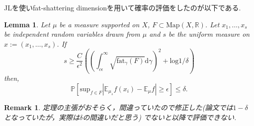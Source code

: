 \documentclass{ujarticle}
\newtheorem{lem}[thm]{Lemma}
\newtheorem*{rem}{Remark}
\begin{document}
JLを使いfat-shattering dimensionを用いて確率の評価をしたのが以下である.
\begin{lem}
  Let $\mu$ be a measure supported on $X$, $F \subset \mathrm{Map}(X,\mathbb{R})$.
  Let $x_1,\dots, x_s$ be independent random variables drawn from $\mu$
  and $s$ be the uniform measure on $x := (x_1,\dots, x_s)$.
  If
\begin{equation*}
s \ge \frac{C}{\epsilon^2}(( \int_{c \epsilon}^{\infty}\sqrt{\mathrm{fat}_{\gamma}(F)}\mathrm{d}\gamma )^2 + \mathrm{log}1/\delta)
\end{equation*}
 then,
\begin{equation*}
 \mathbb{P}[ \mathrm{sup}_{f \in F} |\mathbb{E}_{\mu_s}f(x_i) -\mathbb{E}_{\mu}f|  \ge \epsilon] \le \delta.
\end{equation*}
\end{lem}
\begin{rem}
 定理の主張がおそらく，間違っていたので修正した(論文では$1- \delta$となっていたが，実際は$\delta$の間違いだと思う)
 でないと以降で評価できない.
\end{rem}
\end{document}
